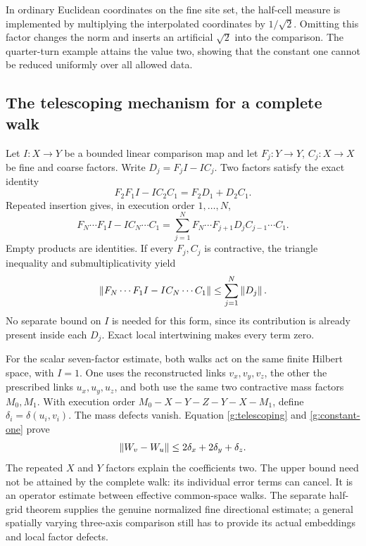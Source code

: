 In ordinary Euclidean coordinates on the fine site set, the half-cell measure is implemented by multiplying the interpolated coordinates by $1/\sqrt2$. Omitting this factor changes the norm and inserts an artificial $\sqrt2$ into the comparison. The quarter-turn example attains the value two, showing that the constant one cannot be reduced uniformly over all allowed data.

\subsection{The telescoping mechanism for a complete walk}
Let $I:X\to Y$ be a bounded linear comparison map and let $F_j:Y\to Y$, $C_j:X\to X$ be fine and coarse factors. Write $D_j=F_jI-IC_j$. Two factors satisfy the exact identity
\[
 F_2F_1I-IC_2C_1=F_2D_1+D_2C_1.
\]
Repeated insertion gives, in execution order $1,\ldots,N$,
\begin{equation}
 F_N\cdots F_1I-IC_N\cdots C_1
 =\sum_{j=1}^N F_N\cdots F_{j+1}D_jC_{j-1}\cdots C_1.
 \label{g:telescoping}
\end{equation}
Empty products are identities. If every $F_j,C_j$ is contractive, the triangle inequality and submultiplicativity yield
\[
 \left\lVert F_N\cdots F_1I-IC_N\cdots C_1\right\rVert
 \leq\sum_{j=1}^N\left\lVert D_j\right\rVert.
\]
No separate bound on $I$ is needed for this form, since its contribution is already present inside each $D_j$. Exact local intertwining makes every term zero.

For the scalar seven-factor estimate, both walks act on the same finite Hilbert space, with $I=1$. One uses the reconstructed links $v_x,v_y,v_z$, the other the prescribed links $u_x,u_y,u_z$, and both use the same two contractive mass factors $M_0,M_1$. With execution order $M_0-X-Y-Z-Y-X-M_1$, define $\delta_i=\delta(u_i,v_i)$. The mass defects vanish. Equation \eqref{g:telescoping} and \eqref{g:constant-one} prove
\begin{equation}
 \left\lVert W_v-W_u\right\rVert\leq 2\delta_x+2\delta_y+\delta_z.
 \label{g:sevenbudget}
\end{equation}
The repeated $X$ and $Y$ factors explain the coefficients two. The upper bound need not be attained by the complete walk: its individual error terms can cancel. It is an operator estimate between effective common-space walks. The separate half-grid theorem supplies the genuine normalized fine directional estimate; a general spatially varying three-axis comparison still has to provide its actual embeddings and local factor defects.

